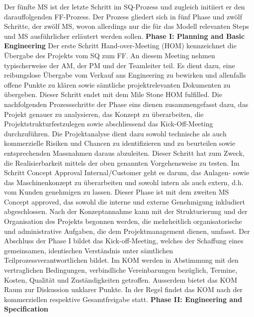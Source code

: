 \newline
Der fünfte MS ist der letzte Schritt im SQ-Prozess und zugleich initiiert er den darauffolgenden FF-Prozess. Der Prozess gliedert sich in fünf Phase und zwölf Schritte, der zwölf MS, wovon allerdings nur die für das Modell relevanten Steps und MS ausführlicher erläutert werden sollen.
\newline
\textbf{Phase I: Planning and Basic Engineering}
\newline
Der erste Schritt Hand-over-Meeting (HOM) kennzeichnet die Übergabe des Projekts vom SQ zum FF. An diesem Meeting nehmen typischerweise der AM, der PM und der Teamleiter teil. Es dient dazu, eine reibungslose Übergabe vom Verkauf ans Engineering zu bewirken und allenfalls offene Punkte zu klären sowie sämtliche projektrelevanten Dokumenten zu übergeben. Dieser Schritt endet mit dem Mile Stone HOM fulfilled. Die nachfolgenden Prozessschritte der Phase eins dienen zusammengefasst dazu, das Projekt genauer zu analysieren, das Konzept zu überarbeiten, die Projektstrukturfestzulegen sowie abschliessend das Kick-Off-Meeting durchzuführen. Die Projektanalyse dient dazu sowohl technische als auch kommerzielle Risiken und Chancen zu identifizieren und zu beurteilen sowie entsprechenden Massnahmen daraus abzuleiten. Dieser Schritt hat zum Zweck, die Realisierbarkeit mittels der oben genannten Vorgehensweise zu testen. Im Schritt Concept Approval Internal/Customer geht es darum, das Anlagen- sowie das Maschinenkonzept zu überarbeiten und sowohl intern als auch extern, d.h. vom Kunden genehmigen zu lassen. Dieser Phase ist mit dem zweiten MS Concept approved, das sowohl die interne und externe Genehmigung inkludiert abgeschlossen. Nach der Konzeptannahme kann mit der Strukturierung und der Organisation des Projekts begonnen werden, die mehrheitlich organisatorische und administrative Aufgaben, die dem Projektmanagement dienen, umfasst. Der Abschluss der Phase I bildet das Kick-off-Meeting, welches der Schaffung eines gemeinsamen, identischen Verständnis unter sämtlichen Teilprozessverantwortlichen bildet. Im KOM werden in Abstimmung mit den vertraglichen Bedingungen, verbindliche Vereinbarungen bezüglich, Termine, Kosten, Qualität und Zuständigkeiten getroffen. Ausserdem bietet das KOM Raum zur Diskussion unklarer Punkte. In der Regel findet das KOM nach der kommerziellen respektive Gesamtfreigabe statt.
\newline
\textbf{Phase II: Engineering and Specification}
\newline
